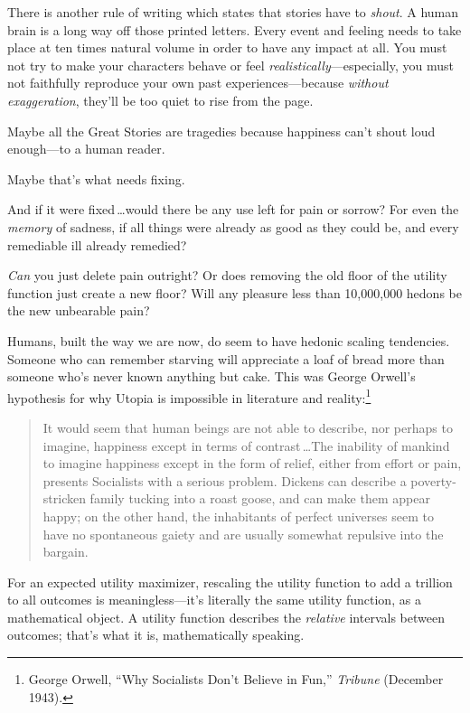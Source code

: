  There is another rule of writing which states that stories have to
\textit{shout}. A human brain is a long way off those printed letters.
Every event and feeling needs to take place at ten times natural volume
in order to have any impact at all. You must not try to make your
characters behave or feel \textit{realistically}{}---especially, you
must not faithfully reproduce your own past experiences---because
\textit{without exaggeration}, they'll be too quiet to
rise from the page.


 Maybe all the Great Stories are tragedies because happiness
can't shout loud enough---to a human reader.


 Maybe that's what needs fixing.


 And if it were fixed\,\ldots would there be any use left for pain or
sorrow? For even the \textit{memory} of sadness, if all things were
already as good as they could be, and every remediable ill already
remedied?


 \textit{Can} you just delete pain outright? Or does removing the
old floor of the utility function just create a new floor? Will any
pleasure less than 10,000,000 hedons be the new unbearable pain?

{
 Humans, built the way we are now, do seem to have hedonic scaling
tendencies. Someone who can remember starving will appreciate a loaf of
bread more than someone who's never known anything but
cake. This was George Orwell's hypothesis for why
Utopia is impossible in literature and reality:\footnote{George Orwell, ``Why Socialists
Don't Believe in Fun,''
\textit{Tribune} (December 1943).}}

\begin{quote}
{
 It would seem that human beings are not able to describe, nor
perhaps to imagine, happiness except in terms of contrast\,\ldots The
inability of mankind to imagine happiness except in the form of relief,
either from effort or pain, presents Socialists with a serious problem.
Dickens can describe a poverty-stricken family tucking into a roast
goose, and can make them appear happy; on the other hand, the
inhabitants of perfect universes seem to have no spontaneous gaiety and
are usually somewhat repulsive into the bargain.}
\end{quote}


 For an expected utility maximizer, rescaling the utility function
to add a trillion to all outcomes is meaningless---it's
literally the same utility function, as a mathematical object. A
utility function describes the \textit{relative} intervals between
outcomes; that's what it is, mathematically speaking.


